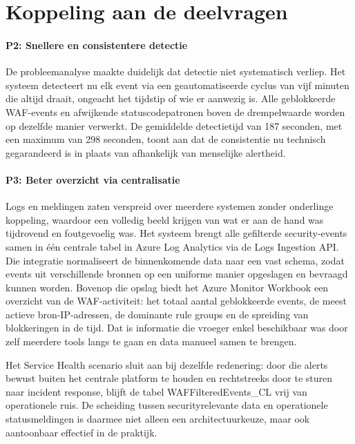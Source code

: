 
\section{Koppeling aan de deelvragen}
\paragraph{P2: Snellere en consistentere detectie}
De probleemanalyse maakte duidelijk dat detectie niet systematisch verliep. Het systeem detecteert nu elk event via een geautomatiseerde cyclus van vijf minuten die altijd draait, ongeacht het tijdstip of wie er aanwezig is. Alle geblokkeerde WAF-events en afwijkende statuscodepatronen boven de drempelwaarde worden op dezelfde manier verwerkt. De gemiddelde detectietijd van 187 seconden, met een maximum van 298 seconden, toont aan dat de consistentie nu technisch gegarandeerd is in plaats van afhankelijk van menselijke alertheid.

\paragraph{P3: Beter overzicht via centralisatie}
Logs en meldingen zaten verspreid over meerdere systemen zonder onderlinge koppeling, waardoor een volledig beeld krijgen van wat er aan de hand was tijdrovend en foutgevoelig was. Het systeem brengt alle gefilterde security-events samen in één centrale tabel in Azure Log Analytics via de Logs Ingestion API. Die integratie normaliseert de binnenkomende data naar een vast schema, zodat events uit verschillende bronnen op een uniforme manier opgeslagen en bevraagd kunnen worden. Bovenop die opslag biedt het Azure Monitor Workbook een overzicht van de WAF-activiteit: het totaal aantal geblokkeerde events, de meest actieve bron-IP-adressen, de dominante rule groups en de spreiding van blokkeringen in de tijd. Dat is informatie die vroeger enkel beschikbaar was door zelf meerdere tools langs te gaan en data manueel samen te brengen.

Het Service Health scenario sluit aan bij dezelfde redenering: door die alerts bewust buiten het centrale platform te houden en rechtstreeks door te sturen naar incident response, blijft de tabel WAFFilteredEvents\_CL vrij van operationele ruis. De scheiding tussen securityrelevante data en operationele statusmeldingen is daarmee niet alleen een architectuurkeuze, maar ook aantoonbaar effectief in de praktijk.

